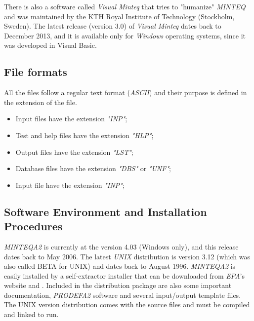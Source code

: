 There is also a software called \emph{Visual Minteq} that tries to "humanize" \emph{MINTEQ} and was maintained by the KTH Royal Institute of Technology (Stockholm, Sweden). The latest release  (version 3.0) of \emph{Visual Minteq} dates back to December 2013, and it is available only for \emph{Windows} operating systems, since it was developed in Visual Basic. 

\subsection{File formats}
All the files follow a regular text format (\emph{ASCII}) and their purpose is defined in the extension of the file. 
\begin{itemize}
\item Input files have the extension \emph{"INP"};
\item Test and help files have the extension \emph{"HLP"};
\item Output files have the extension \emph{"LST"};
\item Database files have the extension \emph{"DBS"} or \emph{"UNF"};
\item Input file have the extension \emph{"INP"};
\end{itemize}


\subsection{Software Environment and Installation Procedures}
\emph{MINTEQA2} is currently at the version 4.03 (Windows only), and this release dates back to May 2006. The latest \emph{UNIX} distribution is version 3.12 (which was also called BETA for UNIX) and dates back to August 1996.
\emph{MINTEQA2} is easily installed by a self-extractor installer that can be downloaded from \emph{EPA}'s website \cite{minteq:website} and \cite{minteq:unix}. Included in the distribution package are also some important documentation, \emph{PRODEFA2} software and several input/output template files.
The UNIX version distribution comes with the source files and must be compiled and linked to run.

